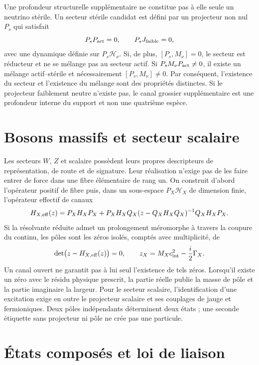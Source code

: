 Une profondeur structurelle supplémentaire ne constitue pas à elle seule un neutrino
stérile. Un secteur stérile candidat est défini par un projecteur non nul
\(P_s\) qui satisfait
\[
 P_s P_{\rm act}=0,
 \qquad P_s J_{\text{faible}}=0,
\]
avec une dynamique définie sur \(P_s\mathcal H_\nu\). Si, de plus,
\([P_s,M_\nu]=0\), le secteur est réducteur et ne se mélange pas au secteur actif. Si
\(P_sM_\nu P_{\rm act}\ne0\), il existe un mélange actif--stérile et nécessairement
\([P_s,M_\nu]\ne0\). Par conséquent, l'existence du secteur et l'existence du
mélange sont des propriétés distinctes. Si le projecteur faiblement neutre n'existe pas,
le canal grossier supplémentaire est une profondeur interne du support et non une quatrième
espèce.

\section{Bosons massifs et secteur scalaire}

Les secteurs \(W\), \(Z\) et scalaire possèdent leurs propres descripteurs de
représentation, de route et de signature. Leur réalisation n'exige pas de les faire entrer de force dans une
fibre élémentaire de rang un. On construit d'abord l'opérateur positif de
fibre puis, dans un sous-espace \(P_X\mathcal H_X\) de dimension finie,
l'opérateur effectif de canaux
\[
 H_{X,\rm eff}(z)
 =P_X H_X P_X
 +P_X H_X Q_X(z-Q_X H_X Q_X)^{-1}Q_X H_X P_X.
\]
Si la résolvante réduite admet un prolongement méromorphe à travers la coupure du
continu, les pôles sont les zéros isolés, comptés avec multiplicité, de
\[
 \det\bigl(z-H_{X,\rm eff}(z)\bigr)=0,
 \qquad
 z_X=M_X c_{\rm int}^2-\frac{i}{2}\Gamma_X.
\]
Un canal ouvert ne garantit pas à lui seul l'existence de tels zéros. Lorsqu'il
existe un zéro avec le résidu physique prescrit, la partie réelle publie la masse de
pôle et la partie imaginaire la largeur. Pour le
secteur scalaire, l'identification d'une excitation exige en outre le projecteur
scalaire et ses couplages de jauge et fermioniques. Deux pôles indépendants
déterminent deux états ; une seconde étiquette sans projecteur ni pôle ne crée pas une
particule.

\section{États composés et loi de liaison}

